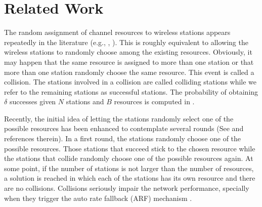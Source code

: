 \documentclass[journal]{IEEEtran}
\newcommand{\AzCom}[1]{{\it \color{magenta} [#1]}}
\begin{document}


\section{Related Work}


The random assignment of channel resources to wireless stations appears repeatedly in the literature (e.g., \cite{szpankowski1983asc}, \cite{kartsakli2011tmd}).
This is roughly equivalent to allowing the wireless stations to randomly choose among the existing resources.
Obviously, it may happen that the same resource is assigned to more than one station or that more than one station randomly choose the same resource.
This event is called a collision.
The stations involved in a collision are called colliding stations while we refer to the remaining stations as successful stations.
The probability of obtaining $\delta$ successes given $N$ stations and $B$ resources is computed in \cite{szpankowski1983asc}.

Recently, the initial idea of letting the stations randomly select one of the possible resources has been enhanced to contemplate several rounds (See \cite{fang2011dlm} and references therein).
In a first round, the stations randomly choose one of the possible resources.
Those stations that succeed stick to the chosen resource while the stations that collide randomly choose one of the possible resources again.
At some point, if the number of stations is not larger than the number of resources, a solution is reached in which each of the stations has its own resource and there are no collisions.
Collisions seriously impair the network performance, specially when they trigger the auto rate fallback (ARF) mechanism \cite{martorell2012pec, martorell2012tfl}.
\end{document}

